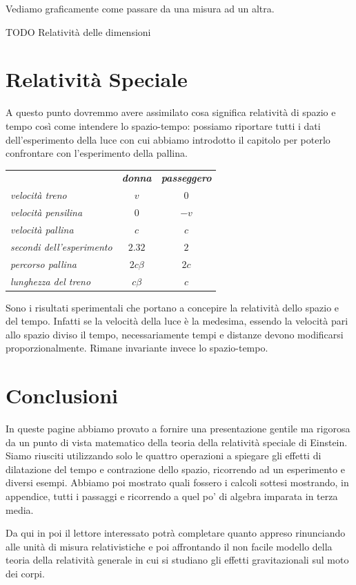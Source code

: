 Vediamo graficamente come passare da una misura ad un altra.

TODO Relatività delle dimensioni


\section{Relatività Speciale}

A questo punto dovremmo avere assimilato cosa significa relatività di spazio e tempo così come intendere lo spazio-tempo: possiamo riportare tutti i dati dell'esperimento della luce con cui abbiamo introdotto il capitolo per poterlo confrontare con l'esperimento della pallina.

\begin{center}
\begin{tabular}{>{\itshape}l >{\itshape}c >{\itshape}c }
\toprule
            & \textbf{donna} & \textbf{passeggero} \\
velocità treno            & $v$        & $0$  \\ 
velocità pensilina        & $0$        & $-v$  \\
velocità pallina          & $c$        & $c$  \\
secondi dell'esperimento  & $2.32$     & $2$  \\
percorso pallina          & $2c \beta$       & $2c$  \\
lunghezza del treno       & $c\beta$   & $c$  \\
\bottomrule
\end{tabular} 
\end{center}

Sono i risultati sperimentali che portano a concepire la relatività dello spazio e del tempo. Infatti se la velocità della luce è la medesima, essendo la velocità pari allo spazio diviso il tempo, necessariamente tempi e distanze devono modificarsi proporzionalmente. Rimane invariante invece lo spazio-tempo.


\section{Conclusioni}

In queste pagine abbiamo provato a fornire una presentazione gentile ma rigorosa da un punto di vista matematico della teoria della relatività speciale di Einstein. Siamo riusciti utilizzando solo le quattro operazioni a spiegare gli effetti di dilatazione del tempo e contrazione dello spazio, ricorrendo ad un esperimento e diversi esempi. Abbiamo poi mostrato quali fossero i calcoli sottesi mostrando, in appendice, tutti i passaggi e ricorrendo a quel po' di algebra imparata in terza media.

Da qui in poi il lettore interessato potrà completare quanto appreso rinunciando alle unità di misura relativistiche e poi affrontando il non facile modello della teoria della relatività generale in cui si studiano gli effetti gravitazionali sul moto dei corpi. 
